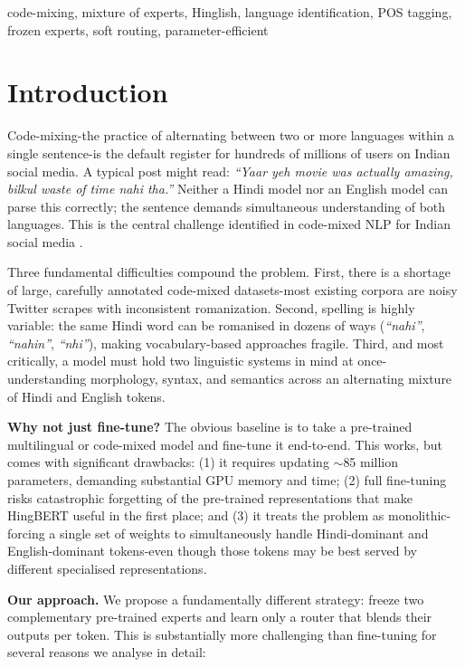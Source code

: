 \documentclass[conference]{IEEEtran}
\begin{document}
\begin{IEEEkeywords}
code-mixing, mixture of experts, Hinglish, language identification, POS tagging, frozen experts, soft routing, parameter-efficient
\end{IEEEkeywords}

\section{Introduction}

Code-mixing-the practice of alternating between two or more languages within a single sentence-is the default register for hundreds of millions of users on Indian social media. A typical post might read: \textit{``Yaar yeh movie was actually amazing, bilkul waste of time nahi tha.''} Neither a Hindi model nor an English model can parse this correctly; the sentence demands simultaneous understanding of both languages. This is the central challenge identified in code-mixed NLP for Indian social media \cite{nayak2022hingbert,aguilar2020lince}.

Three fundamental difficulties compound the problem. First, there is a shortage of large, carefully annotated code-mixed datasets-most existing corpora are noisy Twitter scrapes with inconsistent romanization. Second, spelling is highly variable: the same Hindi word can be romanised in dozens of ways (\textit{``nahi''}, \textit{``nahin''}, \textit{``nhi''}), making vocabulary-based approaches fragile. Third, and most critically, a model must hold two linguistic systems in mind at once-understanding morphology, syntax, and semantics across an alternating mixture of Hindi and English tokens.

\textbf{Why not just fine-tune?} The obvious baseline is to take a pre-trained multilingual or code-mixed model and fine-tune it end-to-end. This works, but comes with significant drawbacks: (1) it requires updating $\sim$85 million parameters, demanding substantial GPU memory and time; (2) full fine-tuning risks catastrophic forgetting of the pre-trained representations that make HingBERT useful in the first place; and (3) it treats the problem as monolithic-forcing a single set of weights to simultaneously handle Hindi-dominant and English-dominant tokens-even though those tokens may be best served by different specialised representations.

\textbf{Our approach.} We propose a fundamentally different strategy: freeze two complementary pre-trained experts and learn only a router that blends their outputs per token. This is substantially more challenging than fine-tuning for several reasons we analyse in detail:
\end{document}
